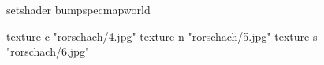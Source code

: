 setshader bumpspecmapworld

    texture c "rorschach/4.jpg"
    texture n "rorschach/5.jpg"
    texture s "rorschach/6.jpg"
